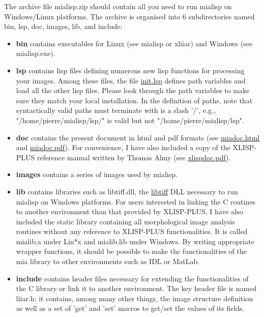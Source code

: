 \documentclass{book}
\renewcommand{\htmladdnormallink}[2]{\href{#2}{#1}}
\begin{document}
The archive file mialisp.zip should contain all you need to run mialisp on Windows/Linux platforms.  The archive is organised into 6 subdirectories named bin, lsp, doc, images, lib, and include:
\begin{itemize}
\item {\bf bin} contains executables for Linux (see mialisp or xliiar) and Windows (see mialisp.exe).
\item {\bf lsp} contains lisp files defining numerous new lisp functions for processing your images.  Among these files, the file \htmladdnormallink{init.lsp}{../lsp/init.lsp} defines path variables and load all the other lisp files.  Please look through the path variables to make sure they match your local installation.  In the definition of paths, note that syntactically valid paths must terminate with is a slash '/', e.g., "/home/pierre/mialisp/lsp/" is valid but not "/home/pierre/mialisp/lsp".
\item {\bf doc} contains the present document in html and pdf formats (see \htmladdnormallink{miadoc.html}{miadoc.html} and  \htmladdnormallink{miadoc.pdf}{miadoc.pdf}).  For convenience, I have also included a copy of the XLISP-PLUS reference manual written by Thomas Almy (see \htmladdnormallink{xlispdoc.pdf}{xlispdoc.pdf}).
\item {\bf images} contains a series of images used by mialisp.
\item {\bf lib} contains libraries such as libtiff.dll, the \htmladdnormallink{libtiff}{http://www.libtiff.org} DLL necessary to run mialisp on Windows platforms.  For users interested in linking the C routines to another environment than that provided by XLISP-PLUS, I have also included the static library containing all morphological image analysis routines without any reference to XLISP-PLUS functionalities.  It is called mialib.a under Lin*x and mialib.lib under Windows.  By writing appropriate wrapper functions, it should be possible to make the functionalities of the mia library to other environments such as IDL or MatLab.
\item {\bf include} contains header files necessary for extending the functionalities of the C library or link it to another environment.  The key header file is named liiar.h: it contains, among many other things, the image structure definition as well as a set of 'get' and 'set' macros to get/set the values of its fields.
\end{itemize}
\end{document}
